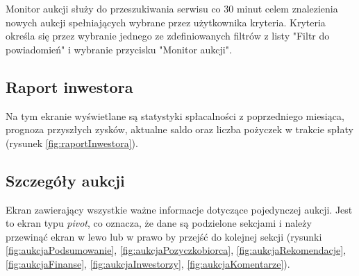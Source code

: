 \documentclass[a4paper,twoside,titlepage,openright]{book}
\begin{document}
Monitor aukcji służy do przeszukiwania serwisu co 30 minut celem znalezienia nowych aukcji spełniających wybrane przez użytkownika kryteria. Kryteria określa się przez wybranie jednego ze zdefiniowanych filtrów z listy "Filtr do powiadomień" i wybranie przycisku "Monitor aukcji".

\subsection{Raport inwestora}
Na tym ekranie wyświetlane są statystyki spłacalności z poprzedniego miesiąca, prognoza przyszłych zysków, aktualne saldo oraz liczba pożyczek w trakcie spłaty (rysunek \ref{fig:raportInwestora}).

\subsection{Szczegóły aukcji}
Ekran zawierający wszystkie ważne informacje dotyczące pojedynczej aukcji. Jest to ekran typu \textit{pivot}, co oznacza, że dane są podzielone sekcjami i należy przewinąć ekran w lewo lub w prawo by przejść do kolejnej sekcji (rysunki \ref{fig:aukcjaPodsumowanie}, \ref{fig:aukcjaPozyczkobiorca}, \ref{fig:aukcjaRekomendacje}, \ref{fig:aukcjaFinanse}, \ref{fig:aukcjaInwestorzy}, \ref{fig:aukcjaKomentarze}).
\end{document}
